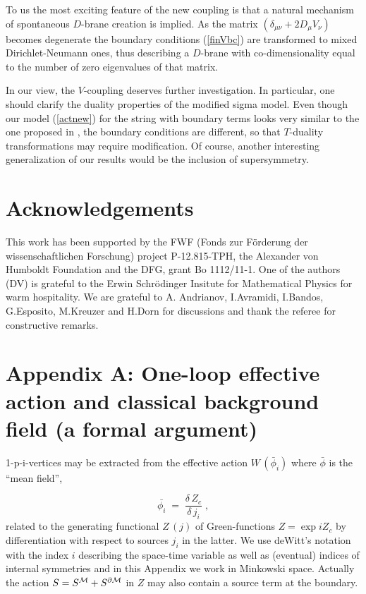 \documentclass[a4paper,12pt]{article}
\begin{document}
To us the most exciting feature of the new coupling is that a natural 
mechanism
of spontaneous $D$-brane creation
is implied. As the matrix $(\delta_{\mu\nu}+
2D_\mu V_\nu )$ becomes degenerate the boundary conditions (\ref{finVbc})
are transformed to  mixed Dirichlet-Neumann ones,
thus describing a $D$-brane with co-dimensionality equal to the
number of zero eigenvalues of that matrix. 

In our view, the $V$-coupling deserves further investigation.
In particular,
one should clarify the duality properties of the modified
sigma model. Even though our model (\ref{actnew}) for the string with
boundary terms looks very similar
to the one proposed in \cite{DLP89,Leigh89}, the boundary conditions
are different, so that $T$-duality transformations may require
modification. Of course, another interesting generalization of our
results would be the inclusion of supersymmetry.  

\section*{Acknowledgements}

This work has been supported by the FWF (Fonds
zur F\"{o}rderung der wissenschaftlichen Forschung) 
project P-12.815-TPH,
the Alexander von Humboldt Foundation and the DFG, grant Bo 1112/11-1.
One of the authors (DV) is grateful to the Erwin Schr\"{o}dinger
Insitute for Mathematical Physics for warm hospitality.
We are grateful to  A. Andrianov,
I.Avramidi, I.Bandos, G.Esposito, M.Kreuzer and H.Dorn
for discussions and thank the referee for constructive remarks. 




\section*{Appendix A:
One-loop effective action and classical background field
(a formal argument)}

1-p-i-vertices 
may be extracted from the effective action $W\, 
(\bar{\phi}_i)$ where $\bar\phi$ is the ``mean field'', 

\begin{equation}
\bar{\phi_i} \; = \; \frac{\delta\,Z_c}{\delta\, j_i}\; ,
\label{w1} 
\end{equation}
related to the generating functional $Z\, (j)$ of 
Green-functions $Z = \exp i Z_c$ by differentiation with 
respect to sources $j_i$ in the latter. We use deWitt's 
notation with the index $i$ describing the space-time 
variable as well as (eventual) indices of internal 
symmetries and in this Appendix we work in Minkowski space. 
Actually the action $S = S^{{\cal M}} + S^{\partial {\cal 
M}}$ in $Z$ may also contain a source term at the boundary. 
\end{document}
